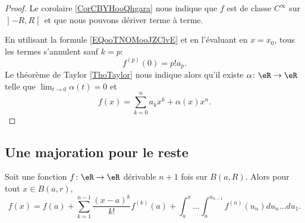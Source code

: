 \begin{proof}
	Le corolaire \ref{CorCBYHooQhgara} nous indique que \( f\) est de classe \(  C^{\infty}\) sur \( \mathopen] -R , R \mathclose[\) et que nous pouvons dériver terme à terme.

	En utilisant la formule \eqref{EQooTNOMooJZClvE} et en l'évaluant en \( x=x_0\), tous les termes s'annulent sauf \( k=p\):
	\begin{equation}
		f^{(p)}(0)=p!a_p.
	\end{equation}
	Le théorème de Taylor \ref{ThoTaylor} nous indique alors qu'il existe \( \alpha\colon \eR\to \eR\) telle que \( \lim_{t\to 0} \alpha(t)=0\) et
	\begin{equation}
		f(x)=\sum_{k=0}^{n}a_kx^k+\alpha(x)x^n.
	\end{equation}
\end{proof}

\subsection{Une majoration pour le reste}

\begin{lemma}       \label{LEMooOVPIooAPWFOm}
	Soit une fonction \( f\colon \eR\to \eR\) dérivable \( n+1\) fois sur \( B(a,R)\). Alors pour tout \( x\in B(a,r)\),
	\begin{equation}
		f(x)=f(a)+\sum_{k=1}^{n-1}\frac{ (x-a)^{k} }{ k! }f^{(k)}(a)+\int_a^{x}\ldots\int_a^{u_{n-1}}f^{(n)}(u_n)du_n\ldots du_1.
	\end{equation}
\end{lemma}

